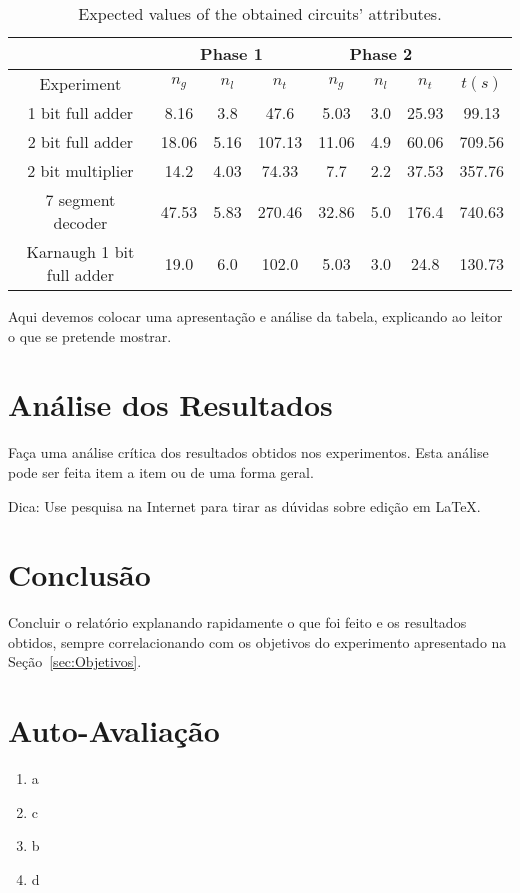 \documentclass[12pt]{article}
\begin{document}
\begin{table}[H]
    \centering
    \caption{Expected values of the obtained circuits' attributes.}
    \begin{tabular}{|c|c|c|c|c|c|c|c|}
    \cline{2-7}
    \multicolumn{1}{c}{} & \multicolumn{3}{|c|}{Phase 1} & \multicolumn{3}{c|}{Phase 2} & \multicolumn{1}{c}{} \\
    \hline
    Experiment & $n_g$ & $n_l$ & $n_t$ & $n_g$ & $n_l$ & $n_t$ & $t(s)$ \\
    \hline
    1 bit full adder & 8.16 & 3.8 & 47.6 & 5.03 & 3.0 & 25.93 & 99.13 \\
    2 bit full adder & 18.06 & 5.16 & 107.13 & 11.06 & 4.9 & 60.06 & 709.56 \\
    2 bit multiplier & 14.2 & 4.03 & 74.33 & 7.7 & 2.2 & 37.53 & 357.76 \\
    7 segment decoder & 47.53 & 5.83 & 270.46 & 32.86 & 5.0 & 176.4 & 740.63 \\
    Karnaugh 1 bit full adder & 19.0 & 6.0 & 102.0 & 5.03 & 3.0 & 24.8 & 130.73 \\
    \hline
    \end{tabular}
    \label{tab:resultados}
\end{table}

Aqui devemos colocar uma apresentação e análise da tabela, explicando ao leitor o que se pretende mostrar.

\section{Análise dos Resultados}
\label{sec:Resultados}

Faça uma análise crítica dos resultados obtidos nos experimentos. Esta análise pode ser feita item a item ou de uma forma geral.

Dica: Use pesquisa na Internet para tirar as dúvidas sobre edição em \LaTeX .

\section{Conclusão}
\label{sec:Conclusao}

Concluir o relatório explanando rapidamente o que foi feito e os resultados obtidos, sempre correlacionando com os objetivos do experimento apresentado na Seção~\ref{sec:Objetivos}. 






\newpage 
\section*{Auto-Avaliação}

\begin{enumerate}
    \item a
    \item c
    \item b
    \item d
\end{enumerate}
\end{document}
